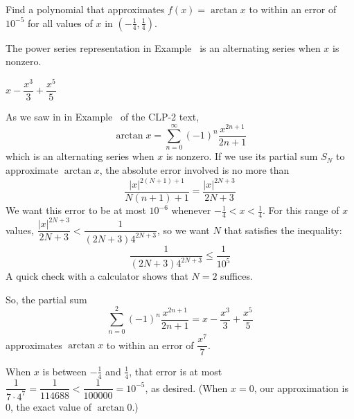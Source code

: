 \begin{question}
Find a polynomial that approximates $f(x)=\arctan x$  to within an error of $10^{-5}$ for all values of $x$ in $\left(-\frac{1}{4},\frac{1}{4}\right)$.
\end{question}
\begin{hint}
The power series representation in Example~ is an alternating series when $x$ is nonzero.
\end{hint}
\begin{answer}
$x-\dfrac{x^3}{3}+\dfrac{x^5}{5}$
\end{answer}
\begin{solution}
As we saw in in Example~  of the CLP-2 text,
\[\arctan x = \sum_{n=0}^\infty (-1)^n\frac{x^{2n+1}}{2n+1}\]
which is an alternating series when $x$ is nonzero. If we use its partial sum $S_N$ to approximate $\arctan x$, the absolute error involved is no more than
 \[\frac{|x|^{2(N+1)+1}}{N(n+1)+1} =\frac{|x|^{2N+3}}{2N+3}\]
 We want this error to be at most $10^{-6}$ whenever $-\frac14< x <\frac14$. For this range of $x$ values,
$ \dfrac{|x|^{2N+3}}{2N+3}<\dfrac{1}{(2N+3)4^{2N+3}}$, so we want $N$ that satisfies the  inequality:
\[
\frac{1}{(2N+3)4^{2N+3}}\le \frac{1}{10^5}
\]
A quick check with a calculator shows that $N=2$ suffices.

So, the partial sum
\[ \sum_{n=0}^2 (-1)^n\frac{x^{2n+1}}{2n+1}=x-\frac{x^3}{3}+\frac{x^5}{5}\]
approximates $\arctan x$ to within an error of
$\dfrac{x^7}{7}$.

When $x$ is between $-\frac14$ and $\frac14$,
that error is at most $\dfrac{1}{7\cdot 4^7}=\dfrac{1}{114688}<\dfrac{1}{100000}=10^{-5}$, as desired. (When $x=0$, our approximation is 0, the exact value of $\arctan 0$.)

\end{solution}
